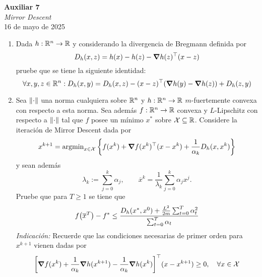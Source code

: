 \documentclass{article}
\begin{document}


\begin{center}
	\Huge{\textbf{Auxiliar 7}}\\
	\textit{\large{Mirror Descent}}\\
	\normalsize
	16 de mayo de 2025
\end{center}

\begin{enumerate}
	\item Dada \(h: \mathbb{R}^n \to \mathbb{R}\) y considerando la divergencia de Bregmann definida por
	      \[D_h(x, z) = h(x) - h(z) - \grad h(z)^\top(x-z)\]
	      pruebe que se tiene la siguiente identidad:
	      \[\forall x, y, z \in \mathbb{R}^n : D_h(x, y) = D_h(x, z) - (x - z)^\top(\grad h(y) - \grad h(z)) + D_h(z, y)\]
	\item Sea \(\norm{\cdot}\) una norma cualquiera sobre \(\mathbb{R}^n\) y \(h: \mathbb{R}^n \to \mathbb{R}\) \(m\)-fuertemente convexa con respecto a esta norma. Sea además \(f:\mathbb{R}^n \to \mathbb{R}\) convexa y \(L\)-Lipschitz con respecto a \(\norm{\cdot}\) tal que \(f\) posee un mínimo \(x^*\) sobre \(\mathcal{X} \subseteq \mathbb{R}\). Considere la iteración de Mirror Descent dada por
	      \[x^{k+1} = \operatorname{argmin}_{x \in \mathcal{X}} \qty{ f(x^k) + \grad f(x^k)^\top(x-x^k) + \frac{1}{\alpha_k} D_h(x, x^k) }\]
	      y sean además
	      \[\lambda_k := \sum_{j=0}^k \alpha_j, \qquad \overline{x}^k = \frac{1}{\lambda_k} \sum_{j=0}^k \alpha_jx^j.\]
	      Pruebe que para \(T \geq 1\) se tiene que
	      \[f\qty(\overline{x}^T) - f^* \leq \frac{D_h(x^*, x^0) + \frac{L^2}{2m} \sum_{t=0}^T \alpha_t^2}{\sum_{t=0}^T \alpha_t}\]
	      \textit{Indicación:} Recuerde que las condiciones necesarias de primer orden para \(x^{k+1}\) vienen dadas por
	      \[ \qty[ \grad f(x^k) + \frac{1}{\alpha_k} \grad h(x^{k+1}) - \frac{1}{\alpha_k} \grad h(x^k)]^\top (x - x^{k+1}) \geq 0, \quad \forall x \in \mathcal{X} \]
\end{enumerate}
\end{document}
